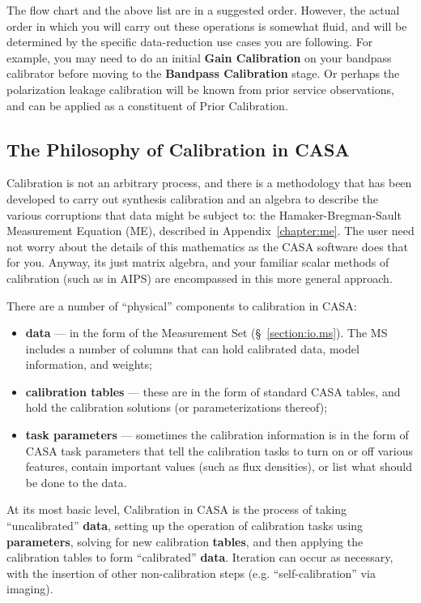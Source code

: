 The flow chart and the above list are in a suggested order.  However,
the actual order in which you will carry out these operations is
somewhat fluid, and will be determined by the specific data-reduction
use cases you are following.  For example, you may need to do an
initial {\bf Gain Calibration} on your bandpass calibrator before
moving to the {\bf Bandpass Calibration} stage.  Or perhaps the
polarization leakage calibration will be known from prior service 
observations, and can be applied as a constituent of Prior Calibration.

\subsection{The Philosophy of Calibration in CASA}
\label{section:cal.flow.philo}

Calibration is not an arbitrary process, and there is
a methodology that has been developed to carry out synthesis
calibration and an algebra to describe the various corruptions
that data might be subject to: the Hamaker-Bregman-Sault Measurement
Equation (ME), described in Appendix~\ref{chapter:me}.
The user need not worry about the details of this mathematics
as the CASA software does that for you.  Anyway, its just
matrix algebra, and your familiar scalar methods of calibration
(such as in AIPS) are encompassed in this more general approach.

There are a number of ``physical'' components to calibration in CASA:
\begin{itemize}
   \item {\bf data} --- in the form of the Measurement Set
      (\S~\ref{section:io.ms}).  The MS includes a number of
      columns that can hold calibrated data, model information,
      and weights;
   \item {\bf calibration tables} --- these are in the form of
      standard CASA tables, and hold the calibration solutions
      (or parameterizations thereof);
   \item {\bf task parameters} --- sometimes the calibration
      information is in the form of CASA task parameters that
      tell the calibration tasks to turn on or off various
      features, contain important values (such as flux densities),
      or list what should be done to the data.
\end{itemize}

At its most basic level, Calibration in CASA is the process of taking
``uncalibrated'' {\bf data}, setting up the operation of calibration
tasks using {\bf parameters}, solving for new calibration {\bf
tables}, and then applying the calibration tables to form 
``calibrated'' {\bf data}.  Iteration can occur as necessary, with
the insertion of other non-calibration steps
(e.g. ``self-calibration'' via imaging).

